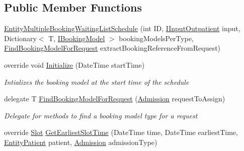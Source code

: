 \subsection*{Public Member Functions}
\begin{DoxyCompactItemize}
\item 
\hyperlink{class_general_health_care_elements_1_1_booking_models_1_1_entity_multiple_booking_waiting_list_schedule_aacf9617783a9b224b8cbee9dc7a77345}{Entity\+Multiple\+Booking\+Waiting\+List\+Schedule} (int ID, \hyperlink{interface_general_health_care_elements_1_1_department_models_1_1_outpatient_1_1_i_input_outpatient}{I\+Input\+Outpatient} input, Dictionary$<$ T, \hyperlink{interface_general_health_care_elements_1_1_booking_models_1_1_i_booking_model}{I\+Booking\+Model} $>$ booking\+Models\+Per\+Type, \hyperlink{class_general_health_care_elements_1_1_booking_models_1_1_entity_multiple_booking_waiting_list_schedule_aa26662d0bc348b272403212b551da07d}{Find\+Booking\+Model\+For\+Request} extract\+Booking\+Reference\+From\+Request)
\item 
override void \hyperlink{class_general_health_care_elements_1_1_booking_models_1_1_entity_multiple_booking_waiting_list_schedule_aaaadc77852f3dae838a13eb475f46e01}{Initialize} (Date\+Time start\+Time)
\begin{DoxyCompactList}\small\item\em Intializes the booking model at the start time of the schedule \end{DoxyCompactList}\item 
delegate T \hyperlink{class_general_health_care_elements_1_1_booking_models_1_1_entity_multiple_booking_waiting_list_schedule_aa26662d0bc348b272403212b551da07d}{Find\+Booking\+Model\+For\+Request} (\hyperlink{class_general_health_care_elements_1_1_treatment_admission_types_1_1_admission}{Admission} request\+To\+Assign)
\begin{DoxyCompactList}\small\item\em Delegate for methods to find a booking model type for a request \end{DoxyCompactList}\item 
override \hyperlink{class_general_health_care_elements_1_1_booking_models_1_1_slot}{Slot} \hyperlink{class_general_health_care_elements_1_1_booking_models_1_1_entity_multiple_booking_waiting_list_schedule_a7d8f46c2d4215df7b954f1c868144a67}{Get\+Earliest\+Slot\+Time} (Date\+Time time, Date\+Time earliest\+Time, \hyperlink{class_general_health_care_elements_1_1_entities_1_1_entity_patient}{Entity\+Patient} patient, \hyperlink{class_general_health_care_elements_1_1_treatment_admission_types_1_1_admission}{Admission} admission\+Type)

\end{DoxyCompactItemize}
